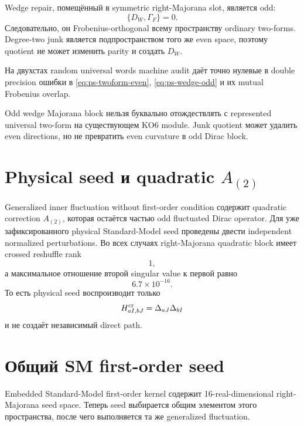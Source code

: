 Wedge repair, помещённый в symmetric right-Majorana slot, является odd:
\begin{equation}
 \{D_W,\Gamma_F\}=0.
 \label{eq:ps-wedge-odd}
\end{equation}
Следовательно, он Frobenius-orthogonal всему пространству ordinary
two-forms. Degree-two junk является подпространством того же even space,
поэтому quotient не может изменить parity и создать \(D_W\).

На двухстах random universal words machine audit даёт точно нулевые в
double precision ошибки в \eqref{eq:ps-twoform-even},
\eqref{eq:ps-wedge-odd} и их mutual Frobenius overlap.

\begin{nogocriterion}
Odd wedge Majorana block нельзя буквально отождествлять с represented
universal two-form на существующем KO6 module. Junk quotient может удалить
even directions, но не превратить even curvature в odd Dirac block.
\end{nogocriterion}

\section{Physical seed и quadratic
\texorpdfstring{\(A_{(2)}\)}{A(2)}}

Generalized inner fluctuation without first-order condition содержит
quadratic correction \(A_{(2)}\), которая остаётся частью odd fluctuated
Dirac operator. Для уже зафиксированного physical Standard-Model seed
проведены двести independent normalized perturbations. Во всех случаях
right-Majorana quadratic block имеет crossed reshuffle rank
\begin{equation}
 \boxed{1},
\end{equation}
а максимальное отношение второй singular value к первой равно
\begin{equation}
 6.7\times10^{-16}.
\end{equation}
То есть physical seed воспроизводит только
\begin{equation}
 H^{\rm cr}_{aI,bJ}=\Delta_{aJ}\Delta_{bI}
\end{equation}
и не создаёт независимый direct path.

\section{Общий SM first-order seed}

Embedded Standard-Model first-order kernel содержит 16-real-dimensional
right-Majorana seed space. Теперь seed выбирается общим элементом этого
пространства, после чего выполняется та же generalized fluctuation.

